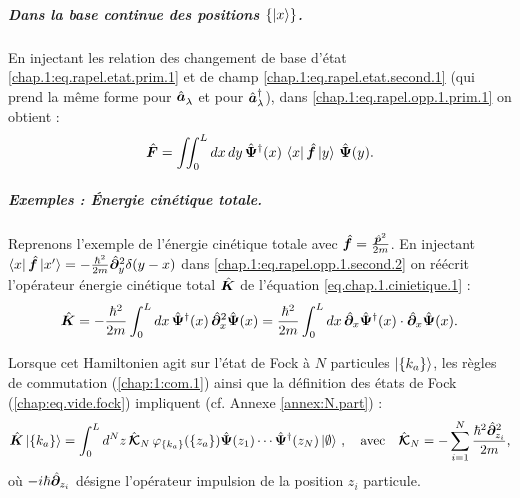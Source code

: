 \subparagraph{Dans la base continue des positions \( \{ \ket{x} \} \).}
En injectant les relation des changement de base d'état
\eqref{chap.1:eq.rapel.etat.prim.1} et de champ \eqref{chap.1:eq.rapel.etat.second.1} (qui prend la même forme pour $\hat{\bm{a}}_\lambda^{}$ et pour $\hat{\bm{a}}_\lambda^\dagger$), dans \eqref{chap.1:eq.rapel.opp.1.prim.1} on obtient :
\begin{eqnarray}\label{chap.1:eq.rapel.opp.1.second.2}
\hat{\bm{F}} = \iint_0^L dx \, dy \, \hat{\bm{\Psi}}^\dagger(x) \, \bra{ x} \hat{\bm{f}} \ket{y} \, \hat{\bm{\Psi}}(y).
\end{eqnarray}%
\begin{mdframed}[
	linewidth=0.5pt, 
	backgroundcolor=gray!5, 
	roundcorner=50pt,	
	innerleftmargin=5pt,
    innerrightmargin=5pt,
    innertopmargin=-10pt,
    innerbottommargin=2pt,
    leftmargin=2pt,
    rightmargin=2pt
]
\subparagraph{Exemples : Énergie cinétique totale.}
Reprenons l'exemple de l'énergie cinétique totale avec  $\hat{\bm{f}} = \frac{\hat{\bm{p}}^2}{2m}$. En injectant $\bra{x} \hat{\bm{f}} \ket{x'} = - \frac{\hbar^2}{2m} \hat{\bm{\partial}}_{y}^2 \delta ( y - x )$ dans \eqref{chap.1:eq.rapel.opp.1.second.2} on réécrit l'opérateur énergie cinétique total $\hat{\bm{K}}$ de l'équation \eqref{eq.chap.1.cinietique.1} :
\begin{eqnarray}
\hat{\bm{K}} =  -\frac{\hbar^2}{2m} \int_0^L dx \, \hat{\bm{\Psi}}^\dagger(x) \, \hat{\bm{\partial}}_x^2 \hat{\bm{\Psi}}(x)
= \frac{\hbar^2}{2m} \int_0^L dx \, \hat{\bm{\partial}}_x \hat{\bm{\Psi}}^\dagger(x) \cdot \hat{\bm{\partial}}_x \hat{\bm{\Psi}}(x). \label{eq.chap.1.cinietique.3}
\end{eqnarray}

Lorsque cet Hamiltonien agit sur l’état de Fock à $N$ particules $\ket{\{k_a\}}$, les règles de commutation (\ref{chap:1:com.1}) ainsi que la définition des états de Fock (\ref{chap:eq.vide.fock}) impliquent (cf. Annexe \ref{annex:N.part}) :
\begin{eqnarray}\label{eq.chap.1.cinietique.4}
\hat{\bm{K}}\ket{ \{k_a\}} =  \int_0^L d^N z \, \hat{\bm{\mathcal{K}}}_N \, \varphi_{\{k_a\}}(\{z_a\} ) \hat{\bm{\Psi}}(z_1) \cdots \hat{\bm{\Psi}}^\dag(z_N) \ket{\emptyset}\, , \quad \mbox{avec} \quad \hat{\bm{\mathcal{K}}}_N = -\sum_{i=1}^N \frac{\hbar^2\hat{\bm{\partial}}_{z_i}^2}{2m}, 
\end{eqnarray}
où \( -i \hbar \hat{\bm{\partial}}_{z_i} \) désigne l’opérateur impulsion de la position \( z_i \) particule.
\end{mdframed}

